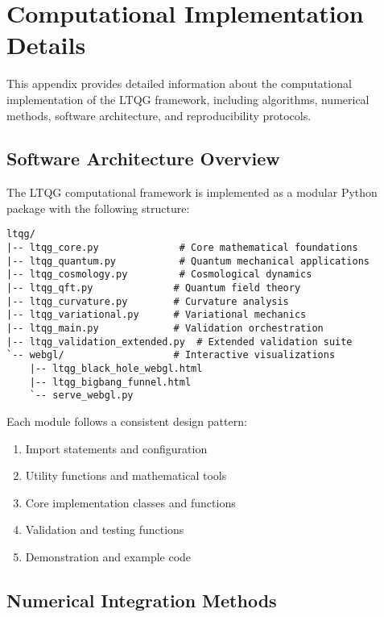 \section{Computational Implementation Details}
\label{app:computational_details}

This appendix provides detailed information about the computational implementation of the LTQG framework, including algorithms, numerical methods, software architecture, and reproducibility protocols.

\subsection{Software Architecture Overview}
\label{app:software_architecture}

The LTQG computational framework is implemented as a modular Python package with the following structure:

\begin{verbatim}
ltqg/
|-- ltqg_core.py              # Core mathematical foundations
|-- ltqg_quantum.py           # Quantum mechanical applications
|-- ltqg_cosmology.py         # Cosmological dynamics
|-- ltqg_qft.py              # Quantum field theory
|-- ltqg_curvature.py        # Curvature analysis
|-- ltqg_variational.py      # Variational mechanics
|-- ltqg_main.py             # Validation orchestration
|-- ltqg_validation_extended.py  # Extended validation suite
`-- webgl/                   # Interactive visualizations
    |-- ltqg_black_hole_webgl.html
    |-- ltqg_bigbang_funnel.html
    `-- serve_webgl.py
\end{verbatim}

Each module follows a consistent design pattern:
\begin{enumerate}
\item Import statements and configuration
\item Utility functions and mathematical tools
\item Core implementation classes and functions
\item Validation and testing functions
\item Demonstration and example code
\end{enumerate}

\subsection{Numerical Integration Methods}
\label{app:numerical_integration}


